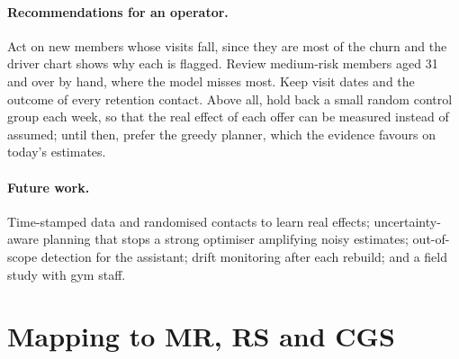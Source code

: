 \documentclass[paper=a4, fontsize=11pt, open=any, parskip=half-,
  headings=small, numbers=noenddot, captions=tableheading, toc=flat]{scrreprt}
\renewcommand{\thesection}{\arabic{section}}
\begin{document}
\paragraph{Recommendations for an operator.} Act on new members whose visits fall, since they are most of the churn and the driver chart shows why each is flagged. Review medium-risk members aged 31 and over by hand, where the model misses most. Keep visit dates and the outcome of every retention contact. Above all, hold back a small random control group each week, so that the real effect of each offer can be measured instead of assumed; until then, prefer the greedy planner, which the evidence favours on today's estimates.

\paragraph{Future work.} Time-stamped data and randomised contacts to learn real effects; uncertainty-aware planning that stops a strong optimiser amplifying noisy estimates; out-of-scope detection for the assistant; drift monitoring after each rebuild; and a field study with gym staff.

\printbibliography[heading=shortbib, title=References]

\clearpage
\renewcommand{\thesection}{\Alph{section}}
\setcounter{section}{0}




\section{Mapping to MR, RS and CGS}
\label{app:mapping}
\end{document}
